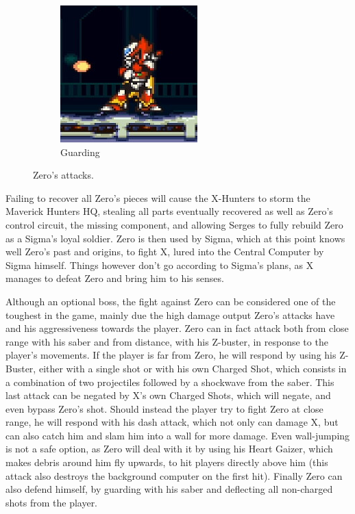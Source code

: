 \begin{figure}[htp]
\begin{subfigure}{0.3\linewidth}
		\includegraphics[width=\linewidth]{figures/X2/Hunter_stages/Zero_guard.png}
		\caption{Guarding}
	\end{subfigure}	
	\caption{Zero's attacks.}	
\end{figure}

Failing to recover all Zero's pieces will cause the X-Hunters to storm the Maverick Hunters HQ, stealing all parts eventually recovered as well as Zero's control circuit, the missing component, and allowing Serges to fully rebuild Zero as a Sigma's loyal soldier. Zero is then used by Sigma, which at this point knows well Zero's past and origins, to fight X, lured into the Central Computer by Sigma himself. Things however  don't go according to Sigma's plans, as X manages to defeat Zero and bring him to his senses.

Although an optional boss, the fight against Zero can be considered one of the toughest in the game, mainly due the high damage output Zero's attacks have and his aggressiveness towards the player. Zero can in fact attack both from close range with his saber and from distance, with his Z-buster, in response to the player's movements. If the player is far from Zero, he will respond by using his Z-Buster, either with a single shot or with his own Charged Shot, which consists in a combination of two projectiles followed by a shockwave from the saber. This last attack can be negated by X's own Charged Shots, which will negate, and even bypass Zero's shot. Should instead the player try to fight Zero at close range, he will respond with his dash attack, which not only can damage X, but can also catch him and slam him into a wall for more damage. Even wall-jumping is not a safe option, as Zero will deal with it by using his Heart Gaizer, which makes debris around him fly upwards, to hit players directly above him (this attack also destroys the background computer on the first hit). Finally Zero can also defend himself, by guarding with his saber and deflecting all non-charged shots from the player.


